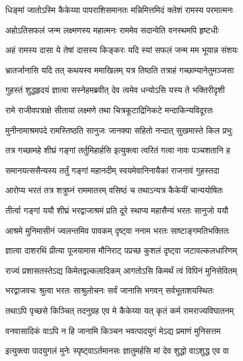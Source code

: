 \twolineshloka
{धिङ्मां जातोऽस्मि कैकेय्या पापराशिसमानतः}
{मन्निमित्तमिदं क्लेशं रामस्य परमात्मनः} %

\twolineshloka
{अहोऽतिसफलं जन्म लक्ष्मणस्य महात्मनः}
{राममेव सदान्वेति वनस्थमपि हृष्टधीः} %

\twolineshloka
{अहं रामस्य दासा ये तेषां दासस्य किङ्करः}
{यदि स्यां सफलं जन्म मम भूयान्न संशयः} %

\twolineshloka
{भ्रातर्जानासि यदि तत् कथयस्व ममाखिलम्}
{यत्र तिष्ठति तत्राहं गच्छाम्यानेतुमञ्जसा} %

\twolineshloka
{गुहस्तं शुद्धहृदयं ज्ञात्वा सस्नेहमब्रवीत्}
{देव त्वमेव धन्योऽसि यस्य ते भक्तिरीदृशी} %

\twolineshloka
{रामे राजीवपत्राक्षे सीतायां लक्ष्मणे तथा}
{चित्रकूटाद्रिनिकटे मन्दाकिन्यविदूरतः} %

\twolineshloka
{मुनीनामाश्रमपदे रामस्तिष्ठति सानुजः}
{जानक्या सहितो नन्दात् सुखमास्ते किल प्रभुः} %

\twolineshloka
{तत्र गच्छामहे शीघ्रं गङ्गां तर्तुमिहार्हसि}
{इत्युक्त्वा त्वरितं गत्वा नावः पञ्चशतानि ह} %

\twolineshloka
{समानयत्ससैन्यस्य तर्तुं गङ्गां महानदीम्}
{स्वयमेवानिनायैकां राजनावं गुहस्तदा} %

\twolineshloka
{आरोप्य भरतं तत्र शत्रुघ्नं राममातरम्}
{वसिष्ठं च तथाऽन्यत्र कैकेयीं चान्ययोषितः} %

\twolineshloka
{तीर्त्वा गङ्गां ययौ शीघ्रं भरद्वाजाश्रमं प्रति}
{दूरे स्थाप्य महासैन्यं भरतः सानुजो ययौ} %

\twolineshloka
{आश्रमे मुनिमासीनं ज्वलन्तमिव पावकम्}
{दृष्ट्वा ननाम भरतः साष्टाङ्गमतिभक्तितः} %

\twolineshloka
{ज्ञात्वा दाशरथिं प्रीत्या पूजयामास मौनिराट्}
{पप्रच्छ कुशलं दृष्ट्वा जटावल्कलधारिणम्} %

\twolineshloka
{राज्यं प्रशासतस्तेऽद्य किमेतद्वल्कलादिकम्}
{आगतोऽसि किमर्थं त्वं विपिनं मुनिसेवितम्} %

\twolineshloka
{भरद्वाजवचः श्रुत्वा भरतः साश्रुलोचनः}
{सर्वं जानासि भगवन् सर्वभूताशयस्थितः} %

\twolineshloka
{तथाऽपि पृच्छसे किञ्चित् तदनुग्रह एव मे}
{कैकेय्या यत् कृतं कर्म रामराज्यविघातनम्} %

\twolineshloka
{वनवासादिकं वाऽपि न हि जानामि किञ्चन}
{भवत्पादयुगं मेऽद्य प्रमाणं मुनिसत्तम} %

\twolineshloka
{इत्युक्त्वा पादयुगलं मुनेः स्पृष्ट्वाऽर्तमानसः}
{ज्ञातुमर्हसि मां देव शुद्धो वाऽशुद्ध एव वा} %

